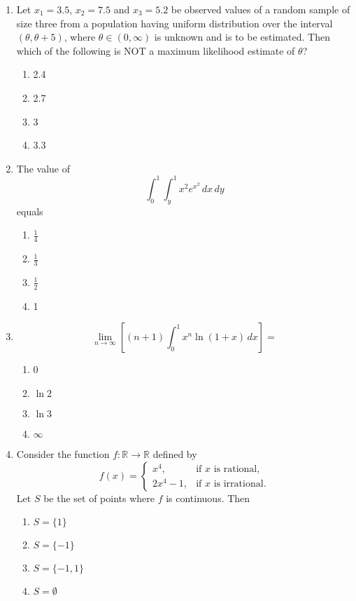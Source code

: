 \documentclass[journal]{IEEEtran}
\numberwithin{equation}{enumi}
\numberwithin{figure}{enumi}
\begin{document}
\begin{enumerate}
\item Let $x_1 = 3.5$, $x_2 = 7.5$ and $x_3 = 5.2$ be observed values of a random sample of size three from a population having uniform distribution over the interval $(\theta, \theta + 5)$, where $\theta \in (0, \infty)$ is unknown and is to be estimated. Then which of the following is NOT a maximum likelihood estimate of $\theta$?
\hfill{}
\begin{multicols}{4}
\begin{enumerate}
    \item 2.4
    \item 2.7
    \item 3
    \item 3.3
\end{enumerate}
\end{multicols}


\item The value of 
\[
\int_0^1 \int_y^1 x^2 e^{x^2} \, dx \, dy
\]
equals
\hfill{}
\begin{multicols}{4}
\begin{enumerate}
    \item $\frac{1}{4}$
    \item $\frac{1}{3}$
    \item $\frac{1}{2}$
    \item 1
\end{enumerate}
\end{multicols}



\item 
\[
\lim_{n \to \infty} \left[ (n+1) \int_0^1 x^n \ln(1+x) \, dx \right] =
\]
\hfill{}
\begin{multicols}{4}
\begin{enumerate}
    \item 0
    \item $\ln 2$
    \item $\ln 3$
    \item $\infty$
\end{enumerate}
\end{multicols}



\item Consider the function $f \colon \mathbb{R} \to \mathbb{R}$ defined by
\[
f(x) = 
\begin{cases}
x^4, & \text{if } x \text{ is rational}, \\
2x^4 - 1, & \text{if } x \text{ is irrational}.
\end{cases}
\]
Let $S$ be the set of points where $f$ is continuous. Then
\hfill{}
\begin{multicols}{4}
\begin{enumerate}
    \item $S = \{1\}$
    \item $S = \{-1\}$
    \item $S = \{-1, 1\}$
    \item $S = \emptyset$
\end{enumerate}
\end{multicols}



\end{enumerate}
\end{document}
